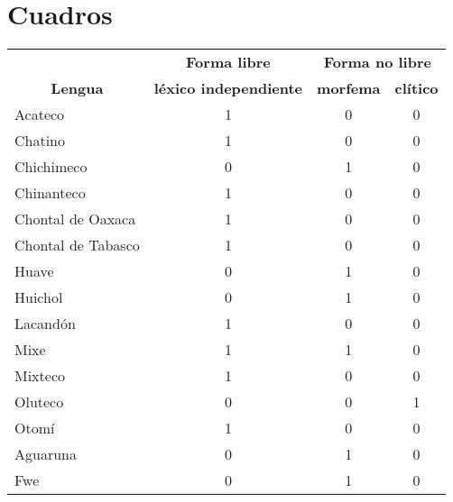 \section*{Cuadros}

\begin{tabular}{lccc}
    & \textbf{Forma libre} & \multicolumn{2}{c}{\textbf{Forma no libre}} \\
\multicolumn{1}{c}{\textbf{Lengua}} & \textbf{léxico independiente} & \textbf{morfema} & \textbf{clítico} \\
\hline \hline
Acateco & 1     & 0     & 0 \\
Chatino & 1     & 0     & 0 \\
Chichimeco & 0     & 1     & 0 \\
Chinanteco & 1     & 0     & 0 \\
Chontal de Oaxaca & 1     & 0     & 0 \\
Chontal de Tabasco & 1     & 0     & 0 \\
Huave & 0     & 1     & 0 \\
Huichol & 0     & 1     & 0 \\
Lacandón & 1     & 0     & 0 \\
Mixe  & 1     & 1     & 0 \\
Mixteco & 1     & 0     & 0 \\
Oluteco & 0     & 0     & 1 \\
Otomí & 1     & 0     & 0 \\
Aguaruna & 0     & 1     & 0 \\
Fwe   & 0     & 1     & 0 \\
\end{tabular}
